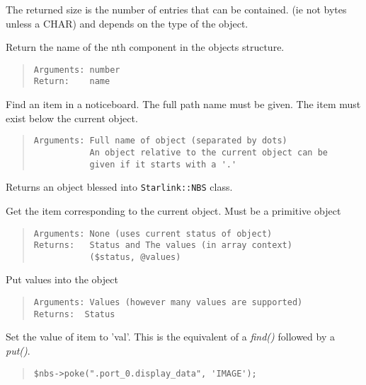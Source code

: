 \documentclass[twoside,11pt]{article}
\newenvironment{myquote}{\begin{quote}\begin{small}}{\end{small}\end{quote}}
\renewcommand{\_}{\texttt{\symbol{95}}}
\begin{document}
\begin{description}
The returned size is the number of entries that can be contained.
(ie not bytes unless a \_{}CHAR) and depends on the type of the object.

\item[nth\_{}name(num)] \mbox{}

Return the name of the nth component in the objects structure.
\begin{myquote}
\begin{verbatim}
Arguments: number
Return:    name
\end{verbatim}
\end{myquote}

\item[find] \mbox{}

Find an item in a noticeboard. The full path name must be given.
The item must exist below the current object.
\begin{myquote}
\begin{verbatim}
Arguments: Full name of object (separated by dots)
           An object relative to the current object can be
           given if it starts with a '.'
\end{verbatim}
\end{myquote}

Returns an object blessed into {\tt Starlink::NBS} class.

\item[get] \mbox{}

Get the item corresponding to the current object.
Must be a primitive object
\begin{myquote}
\begin{verbatim}
Arguments: None (uses current status of object)
Returns:   Status and The values (in array context)
           ($status, @values)
\end{verbatim} 
\end{myquote} %

\item[put] \mbox{}

Put values into the object
\begin{myquote}
\begin{verbatim}
Arguments: Values (however many values are supported)
Returns:  Status
\end{verbatim}
\end{myquote}

\item[poke(item, val)] \mbox{}

Set the value of item to 'val'.
This is the equivalent of a {\em find()\/} followed by a {\em put()\/}.
\begin{myquote}
\begin{verbatim}
$nbs->poke(".port_0.display_data", 'IMAGE');
\end{verbatim} 
\end{myquote} %


\end{description}
\end{document}
